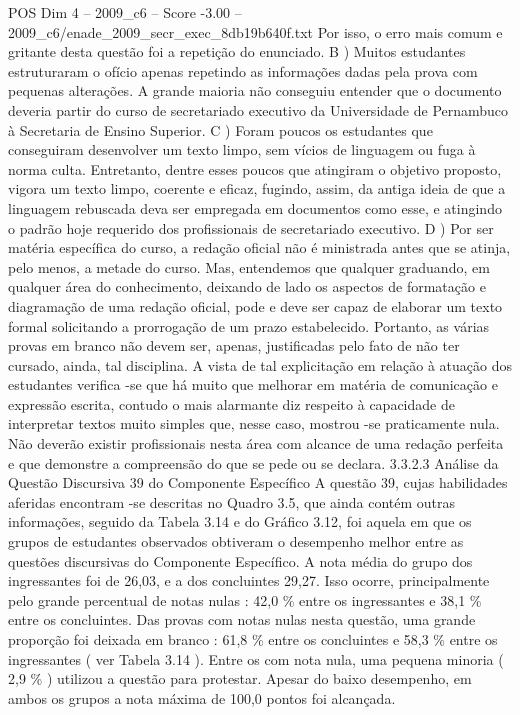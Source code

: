 \begin{textsample}{POS Dim 4 – 2009\_c6 – Score -3.00 – 2009\_c6/enade\_2009\_secr\_exec\_8db19b640f.txt}
Por isso, o erro mais comum e gritante desta questão foi a repetição do enunciado.
B ) Muitos estudantes estruturaram o ofício apenas repetindo as informações dadas pela prova com pequenas alterações.
A grande maioria não conseguiu entender que o documento deveria partir do curso de secretariado executivo da Universidade de Pernambuco à Secretaria de Ensino Superior.
C ) Foram poucos os estudantes que conseguiram desenvolver um texto limpo, sem vícios de linguagem ou fuga à norma culta.
Entretanto, dentre esses poucos que atingiram o objetivo proposto, vigora um texto limpo, coerente e eficaz, fugindo, assim, da antiga ideia de que a linguagem rebuscada deva ser empregada em documentos como esse, e atingindo o padrão hoje requerido dos profissionais de secretariado executivo.
D ) Por ser matéria específica do curso, a redação oficial não é ministrada antes que se atinja, pelo menos, a metade do curso.
Mas, entendemos que qualquer graduando, em qualquer área do conhecimento, deixando de lado os aspectos de formatação e diagramação de uma redação oficial, pode e deve ser capaz de elaborar um texto formal solicitando a prorrogação de um prazo estabelecido.
Portanto, as várias provas em branco não devem ser, apenas, justificadas pelo fato de não ter cursado, ainda, tal disciplina.
A vista de tal explicitação em relação à atuação dos estudantes verifica -se que há muito que melhorar em matéria de comunicação e expressão escrita, contudo o mais alarmante diz respeito à capacidade de interpretar textos muito simples que, nesse caso, mostrou -se praticamente nula.
Não deverão existir profissionais nesta área com alcance de uma redação perfeita e que demonstre a compreensão do que se pede ou se declara. 3.3.2.3 Análise da Questão Discursiva 39 do Componente Específico A questão 39, cujas habilidades aferidas encontram -se descritas no Quadro 3.5, que ainda contém outras informações, seguido da Tabela 3.14 e do Gráfico 3.12, foi aquela em que os grupos de estudantes observados obtiveram o desempenho melhor entre as questões discursivas do Componente Específico.
A nota média do grupo dos ingressantes foi de 26,03, e a dos concluintes 29,27.
Isso ocorre, principalmente pelo grande percentual de notas nulas : 42,0 \% entre os ingressantes e 38,1 \% entre os concluintes.
Das provas com notas nulas nesta questão, uma grande proporção foi deixada em branco : 61,8 \% entre os concluintes e 58,3 \% entre os ingressantes ( ver Tabela 3.14 ).
Entre os com nota nula, uma pequena minoria ( 2,9 \% ) utilizou a questão para protestar.
Apesar do baixo desempenho, em ambos os grupos a nota máxima de 100,0 pontos foi alcançada.

\end{textsample}
